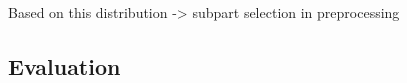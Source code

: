 Based on this distribution -> subpart selection in preprocessing


\subsection{Evaluation}  \label{ch:experimentsB}



\newpage
